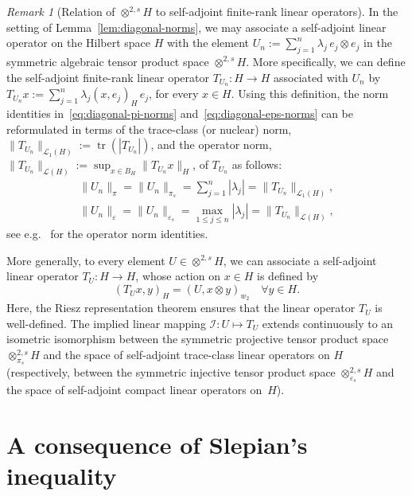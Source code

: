 \documentclass[reqno]{amsart}
\numberwithin{equation}{section}
\newcommand{\cI}{\mathcal{I}}
\newcommand{\cL}{\mathcal{L}}
\newcommand{\norm}[2]{     \| #1       \|_{ #2 }}
\newcommand{\scalar}[2]{     ( #1       )_{ #2 }}
\newcommand{\from}{\colon}
\newcommand{\eps}{\varepsilon}
\theoremstyle{remark}
\newtheorem{remark}[lemma]{Remark}
\theoremstyle{definition}
\begin{document}
\begin{remark}[Relation of $\otimes^{2,s} H$ 
		to self-adjoint finite-rank linear operators]
	In the setting of Lemma~\ref{lem:diagonal-norms}, 
	we may associate 
	a self-adjoint linear operator on the Hilbert space $H$ 
	with the element 
	$U_n := \sum_{j=1}^n \lambda_j \, e_j\otimes e_j$ 
	in the symmetric algebraic tensor product space $\otimes^{2,s} H$. 
	More specifically, 
	we can define the self-adjoint 
	finite-rank linear operator $T_{U_n} \from H \to H$
	associated with $U_n$ by 
	$T_{U_n} x 
	:= 
	\sum_{j=1}^n \lambda_j \scalar{x, e_j}{H} \, e_j$, 
	for every $x\in H$. 
	Using this definition, the norm identities 
	in~\eqref{eq:diagonal-pi-norms} and~\eqref{eq:diagonal-eps-norms} 
	can be reformulated in terms of 
	the trace-class (or nuclear) norm, 
	$\norm{T_{U_n}}{\cL_1(H)} := \operatorname{tr} ( |T_{U_n}| )$, 
	and the operator norm, 
	$\norm{T_{U_n}}{\cL(H)} := \sup_{x\in B_H } \norm{ T_{U_n} x}{H}$, 
	of $T_{U_n}$ as follows: 
	\begin{gather*} 
		\textstyle 
		\norm{U_n}{\pi}
		= 
		\norm{U_n}{\pi_s} 
		= 
		\sum\limits_{j=1}^n |\lambda_j| 
		= 
		\norm{T_{U_n}}{\cL_1(H)} , 
		\\ 
		\norm{U_n}{\eps} 
		= 
		\norm{U_n}{\eps_s}
		= 
		\max_{1\leq j\leq n} |\lambda_j| 
		= 
		\norm{T_{U_n}}{\cL(H)} , 
	\end{gather*} 
	see e.g.\ \cite[Theorem~14.15.(1) and Theorem~8.11]{vanNeerven-FA} 
	for the operator norm identities. 
	
	More generally, 
	to every element $U \in \otimes^{2,s} H$, 
	we can associate a self-adjoint linear operator $T_U\from H \to H$, 
	whose action on $x\in H$ is defined by 
	\[
		\scalar{T_U x, y}{H} 
		= 
		\scalar{U, x\otimes y}{w_2} 
		\quad 
		\forall y \in H. 
	\]
	Here, the Riesz representation theorem 
	ensures that the linear operator 
	$T_U$ is well-defined. 
	The implied linear mapping 
	${\cI: U \mapsto T_U}$
	extends continuously 
	to an isometric isomorphism 
	between the 
	symmetric projective tensor product space $\otimes^{2,s}_{\pi_s} H$ 
	and the space of self-adjoint trace-class linear operators on $H$ 
	(respectively, between the 
	symmetric injective tensor product space $\otimes^{2,s}_{\eps_s} H$ 
	and the space of self-adjoint compact linear operators on~$H$). 
\end{remark} 

\section{A consequence of Slepian's inequality}
\label{appendix:details-fernique} 
\end{document}
